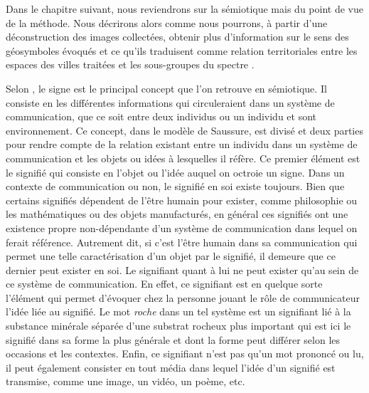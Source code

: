 Dans le chapitre suivant, nous reviendrons sur la sémiotique mais du point de vue de la méthode. 
Nous décrirons alors comme nous pourrons, à partir d'une déconstruction des images collectées, obtenir plus d'information sur le sens des géosymboles évoqués et ce qu'ils traduisent comme relation territoriales entre les espaces des villes traitées et les sous-groupes du spectre \lgbt{}.

Selon \citet[113][]{Rose2012}, le signe est le principal concept que l'on retrouve en sémiotique. 
Il consiste en les différentes informations qui circuleraient dans un système de communication, que ce soit entre deux individus ou un individu et sont environnement. 
Ce concept, dans le modèle de Saussure, est divisé et deux parties pour rendre compte de la relation existant entre un individu dans un système de communication et les objets ou idées à lesquelles il réfère. 
Ce premier élément est le signifié qui consiste en l'objet ou l'idée auquel on octroie un signe. 
Dans un contexte de communication ou non, le signifié en soi existe toujours. 
Bien que certains signifiés dépendent de l'être humain pour exister, comme philosophie ou les mathématiques ou des objets manufacturés, en général ces signifiés ont une existence propre non-dépendante d'un système de communication dans lequel on ferait référence. 
Autrement dit, si c'est l'être humain dans sa communication qui permet une telle caractérisation d'un objet par le signifié, il demeure que ce dernier peut exister en soi. 
Le signifiant quant à lui ne peut exister qu'au sein de ce système de communication. 
En effet, ce signifiant est en quelque sorte l'élément qui permet d'évoquer chez la personne jouant le rôle de communicateur l'idée liée au signifié. 
Le mot \emph{roche} dans un tel système est un signifiant lié à la substance minérale séparée d'une substrat rocheux plus important qui est ici le signifié dans sa forme la plus générale et dont la forme peut différer selon les occasions et les contextes. 
Enfin, ce signifiant n'est pas qu'un mot prononcé ou lu, il peut également consister en tout média dans lequel l'idée d'un signifié est transmise, comme une image, un vidéo, un poème, etc.

